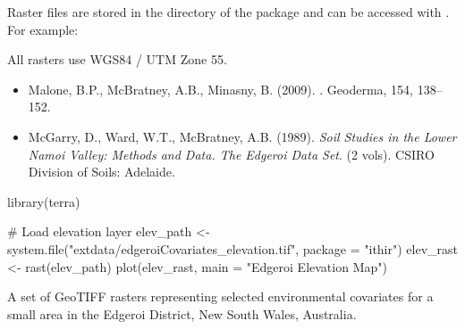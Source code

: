 \documentclass[a4paper]{book}
\begin{document}
%
\begin{Note}
Raster files are stored in the  directory of the package and can be accessed with . For example:


All rasters use WGS84 / UTM Zone 55.
\end{Note}
%
\begin{References}
\begin{itemize}

\item{} Malone, B.P., McBratney, A.B., Minasny, B. (2009). . Geoderma, 154, 138–152.
\item{} McGarry, D., Ward, W.T., McBratney, A.B. (1989). \emph{Soil Studies in the Lower Namoi Valley: Methods and Data. The Edgeroi Data Set}. (2 vols). CSIRO Division of Soils: Adelaide.

\end{itemize}

\end{References}
%
\begin{Examples}
\begin{ExampleCode}
library(terra)

# Load elevation layer
elev_path <- system.file("extdata/edgeroiCovariates_elevation.tif", package = "ithir")
elev_rast <- rast(elev_path)
plot(elev_rast, main = "Edgeroi Elevation Map")
\end{ExampleCode}
\end{Examples}
%
\begin{Description}
A set of GeoTIFF rasters representing selected environmental covariates for a small area in the Edgeroi District, New South Wales, Australia.
\end{Description}
\end{document}
